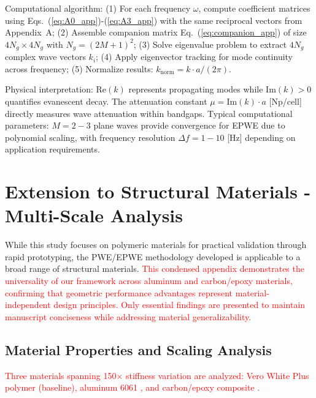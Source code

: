 \documentclass[review,numbers,sort&compress]{elsarticle}
\begin{document}
Computational algorithm: (1) For each frequency $\omega$, compute coefficient matrices using Eqs.~(\ref{eq:A0_app})-(\ref{eq:A3_app}) with the same reciprocal vectors from Appendix~A; (2) Assemble companion matrix Eq.~(\ref{eq:companion_app}) of size $4N_g \times 4N_g$ with $N_g = (2M+1)^2$; (3) Solve eigenvalue problem to extract $4N_g$ complex wave vectors $k_i$; (4) Apply eigenvector tracking for mode continuity across frequency; (5) Normalize results: $k_{\text{norm}} = k \cdot a/(2\pi)$.

Physical interpretation: $\text{Re}(k)$ represents propagating modes while $\text{Im}(k) > 0$ quantifies evanescent decay. The attenuation constant $\mu = \text{Im}(k) \cdot a$ [Np/cell] directly measures wave attenuation within bandgaps. Typical computational parameters: $M = 2-3$ plane waves provide convergence for EPWE due to polynomial scaling, with frequency resolution $\Delta f = 1-10$ [Hz] depending on application requirements.


\newpage
\section{Extension to Structural Materials - Multi-Scale Analysis}\label{multi_material_analysis}

While this study focuses on polymeric materials for practical validation through rapid prototyping, the PWE/EPWE methodology developed is applicable to a broad range of structural materials. \textcolor{red}{This condensed appendix demonstrates the universality of our framework across aluminum and carbon/epoxy materials, confirming that geometric performance advantages represent material-independent design principles. Only essential findings are presented to maintain manuscript conciseness while addressing material generalizability.}

\subsection{Material Properties and Scaling Analysis}

\textcolor{red}{Three materials spanning 150× stiffness variation are analyzed: Vero White Plus polymer (baseline), aluminum 6061 \cite{Xiao_2012}, and carbon/epoxy composite \cite{CMH17_2012}.}
\end{document}
